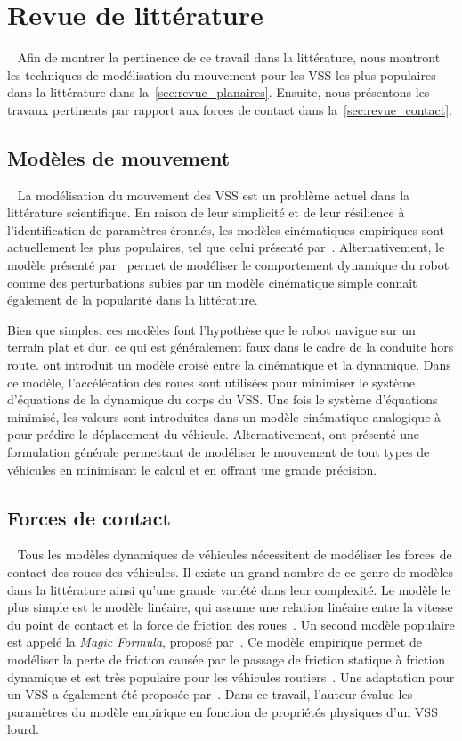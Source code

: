 \section{Revue de littérature}~\label{sec:revue}
Afin de montrer la pertinence de ce travail dans la littérature, nous montront les techniques de modélisation du mouvement pour les \ac{VSS} les plus populaires dans la littérature dans la~\autoref{sec:revue_planaires}. 
Ensuite, nous présentons les travaux pertinents par rapport aux forces de contact dans la~\autoref{sec:revue_contact}.

\subsection{Modèles de mouvement}~\label{sec:revue_planaires}
La modélisation du mouvement des \ac{VSS} est un problème actuel dans la littérature scientifique.
En raison de leur simplicité et de leur résilience à l'identification de paramètres éronnés, les modèles cinématiques empiriques sont actuellement les plus populaires, tel que celui présenté par~\citet{Mandow2007}.
Alternativement, le modèle présenté par~\citet{Seegmiller2014} permet de modéliser le comportement dynamique du robot comme des perturbations subies par un modèle cinématique simple connaît également de la popularité dans la littérature.

Bien que simples, ces modèles font l'hypothèse que le robot navigue sur un terrain plat et dur, ce qui est généralement faux dans le cadre de la conduite hors route.
\citet{Rabiee2019} ont introduit un modèle croisé entre la cinématique et la dynamique.
Dans ce modèle, l'accélération des roues sont utilisées pour minimiser le système d'équations de la dynamique du corps du \ac{VSS}.
Une fois le système d'équations minimisé, les valeurs sont introduites dans un modèle cinématique analogique à~\citep{Mandow2007} pour prédire le déplacement du véhicule.
Alternativement, \citet{Seegmiller2016} ont présenté une formulation générale permettant de modéliser le mouvement de tout types de véhicules en minimisant le calcul et en offrant une grande précision.

\subsection{Forces de contact}~\label{sec:revue_contact}
Tous les modèles dynamiques de véhicules nécessitent de modéliser les forces de contact des roues des véhicules.
Il existe un grand nombre de ce genre de modèles dans la littérature ainsi qu'une grande variété dans leur complexité.
Le modèle le plus simple est le modèle linéaire, qui assume une relation linéaire entre la vitesse du point de contact et la force de friction des roues~\citep{Pacejka2012}. 
Un second modèle populaire est appelé la \textit{Magic Formula}, proposé par~\citet{Pacejka2012}.
Ce modèle empirique permet de modéliser la perte de friction causée par le passage de friction statique à friction dynamique et est très populaire pour les véhicules routiers~\citep{Brach2011}.
Une adaptation pour un \ac{VSS} a également été proposée par~\citet{Maclaurin2011}.
Dans ce travail, l'auteur évalue les paramètres du modèle empirique en fonction de propriétés physiques d'un \ac{VSS} lourd.

